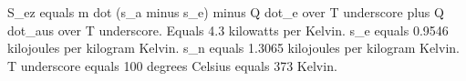 S_ez equals m dot (s_a minus s_e) minus Q dot_e over T underscore plus Q dot_aus over T underscore. Equals 4.3 kilowatts per Kelvin. s_e equals 0.9546 kilojoules per kilogram Kelvin. s_n equals 1.3065 kilojoules per kilogram Kelvin. T underscore equals 100 degrees Celsius equals 373 Kelvin.